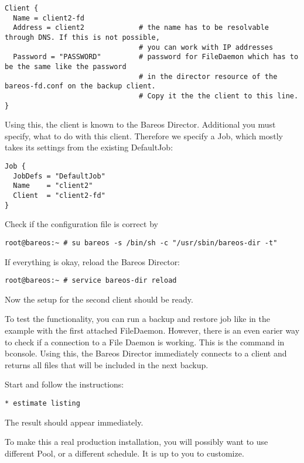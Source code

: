 \footnotesize
\begin{verbatim}
Client {
  Name = client2-fd
  Address = client2             # the name has to be resolvable through DNS. If this is not possible,
                                # you can work with IP addresses
  Password = "PASSWORD"         # password for FileDaemon which has to be the same like the password
                                # in the director resource of the bareos-fd.conf on the backup client.
                                # Copy it the the client to this line.
}
\end{verbatim}
\normalsize

Using this, the client is known to the Bareos Director. Additional you must specify, what to do with this client.
Therefore we specify a Job, which mostly takes its settings from the existing DefaultJob:

\footnotesize
\begin{verbatim}
Job {
  JobDefs = "DefaultJob"
  Name    = "client2"
  Client  = "client2-fd"
}
\end{verbatim}
\normalsize

Check if the configuration file is correct by
\footnotesize
\begin{verbatim}
root@bareos:~ # su bareos -s /bin/sh -c "/usr/sbin/bareos-dir -t"
\end{verbatim}
\normalsize

If everything is okay, reload the Bareos Director:
\footnotesize
\begin{verbatim}
root@bareos:~ # service bareos-dir reload
\end{verbatim}
\normalsize

Now the setup for the second client should be ready.

To test the functionality, you can run a backup and restore job like in the example with the first attached FileDaemon.
However, there is an even earier way to check if a connection to a File Daemon is working. This is the  command in bconsole. Using this, the Bareos Director immediately connects to a client and returns all files that will be included in the next backup.

Start  and follow the instructions:
\footnotesize
\begin{verbatim}
* estimate listing
\end{verbatim}
\normalsize

The result should appear immediately.

To make this a real production installation, you will possibly want to use
different Pool, or a different schedule. It is up to you to customize.


